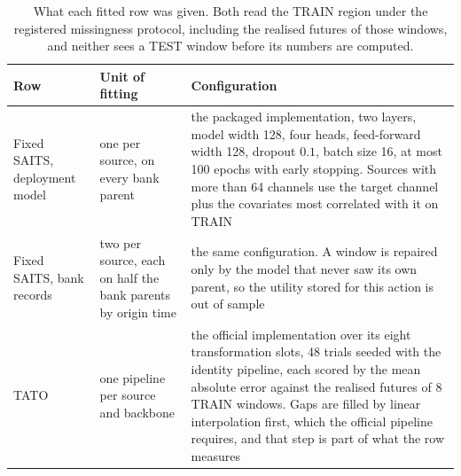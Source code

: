 \documentclass{article}
\begin{document}
\begin{table}[htbp]
  \caption{What each fitted row was given. Both read the TRAIN region under the registered
  missingness protocol, including the realised futures of those windows, and neither sees a
  TEST window before its numbers are computed.}
  \label{tab:app-baselinecfg}
  \centering
  \small
  \setlength{\tabcolsep}{4pt}
\begin{tabular}{@{}p{} p{} p{}@{}}
    \toprule
    Row & Unit of fitting & Configuration \\
    \midrule
    Fixed SAITS, deployment model & one per source, on every bank parent & the packaged implementation, two layers, model width 128, four heads, feed-forward width 128, dropout $0.1$, batch size 16, at most 100 epochs with early stopping. Sources with more than 64 channels use the target channel plus the covariates most correlated with it on TRAIN \\
    Fixed SAITS, bank records & two per source, each on half the bank parents by origin time & the same configuration. A window is repaired only by the model that never saw its own parent, so the utility stored for this action is out of sample \\
    TATO & one pipeline per source and backbone & the official implementation over its eight transformation slots, 48 trials seeded with the identity pipeline, each scored by the mean absolute error against the realised futures of 8 TRAIN windows. Gaps are filled by linear interpolation first, which the official pipeline requires, and that step is part of what the row measures \\
    \bottomrule
  \end{tabular}
\end{table}
\end{document}

